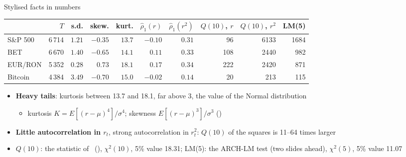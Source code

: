 \begin{frame}{Stylised facts in numbers}
\itemsize{\footnotesize}
\begin{center}
\scriptsize
\begin{tabular}{lrrrrrrrrr}
\toprule
& $T$ & s.d. & skew. & kurt. & $\hat\rho_1(r)$ & $\hat\rho_1(r^2)$ & $Q(10)$, $r$ & $Q(10)$, $r^2$ & LM(5) \\
\midrule
S\&P 500 & 6\,714 & $1.21$ & $\ensuremath{-}0.35$ & $13.7$ & $\ensuremath{-}0.10$ & $0.31$ & 96 & 6133 & 1684 \\
BET & 6\,670 & $1.40$ & $\ensuremath{-}0.65$ & $14.1$ & $0.11$ & $0.33$ & 108 & 2440 & 982 \\
EUR/RON & 5\,352 & $0.28$ & $0.73$ & $18.1$ & $0.17$ & $0.34$ & 222 & 2420 & 871 \\
Bitcoin & 4\,384 & $3.49$ & $\ensuremath{-}0.70$ & $15.0$ & $\ensuremath{-}0.02$ & $0.14$ & 20 & 213 & 115 \\
\bottomrule
\end{tabular}
\end{center}
\begin{itemize}
    \item \textbf{Heavy tails}: kurtosis between 13.7 and 18.1, far above 3, the value of the Normal distribution
    \begin{itemize}
        \item kurtosis $K = E[(r - \mu)^4]/\sigma^4$; skewness $E[(r - \mu)^3]/\sigma^3$ ()
    \end{itemize}
    \item \textbf{Little autocorrelation in $r_t$}, strong autocorrelation in $r_t^2$: $Q(10)$ of the squares is 11--64 times larger
    \item $Q(10)$: the statistic of \ (), $\chi^2(10)$, 5\% value 18.31; LM(5): the ARCH-LM test (two slides ahead), $\chi^2(5)$, 5\% value 11.07
\end{itemize}
\end{frame}

